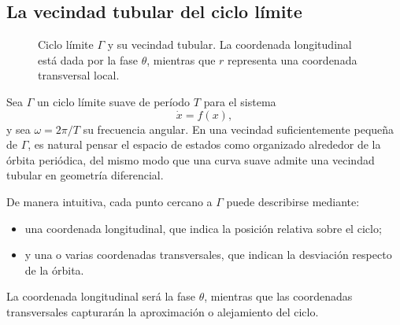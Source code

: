 \subsection{La vecindad tubular del ciclo límite}
\begin{figure}[t]
\centering
{}
\caption{Ciclo l\'imite \(\Gamma\) y su vecindad tubular. La coordenada longitudinal est\'a dada por la fase \(\theta\), mientras que \(r\) representa una coordenada transversal local.}
\label{fig:koopman_tube_neighborhood}
\end{figure}
Sea \(\Gamma\) un ciclo límite suave de período \(T\) para el sistema
\begin{equation}
\dot{x}=f(x),
\label{eq:Koopman_tube_system}
\end{equation}
y sea \(\omega=2\pi/T\) su frecuencia angular. En una vecindad suficientemente pequeña de \(\Gamma\), es natural pensar el espacio de estados como organizado alrededor de la órbita periódica, del mismo modo que una curva suave admite una vecindad tubular en geometría diferencial.

De manera intuitiva, cada punto cercano a \(\Gamma\) puede describirse mediante:
\begin{itemize}
\item una coordenada longitudinal, que indica la posición relativa sobre el ciclo;
\item y una o varias coordenadas transversales, que indican la desviación respecto de la órbita.
\end{itemize}
La coordenada longitudinal será la fase \(\theta\), mientras que las coordenadas transversales capturarán la aproximación o alejamiento del ciclo.

